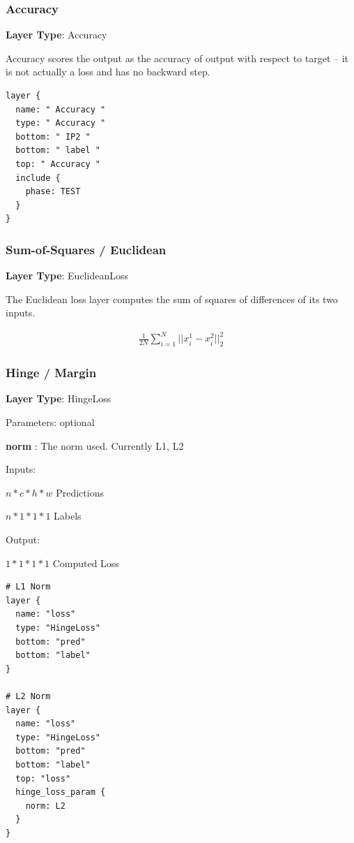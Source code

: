 \documentclass[12pt]{article}
\begin{document}
\subsubsection{Accuracy}

\noindent \textbf{Layer Type}: Accuracy

Accuracy scores the output as the accuracy of output with respect to target – it is not actually a loss and has no backward step.

\begin{lstlisting}[style=json, frame=single]
layer {
  name: " Accuracy "
  type: " Accuracy "
  bottom: " IP2 "
  bottom: " label "
  top: " Accuracy "
  include {
    phase: TEST
  }
}
\end{lstlisting}

\subsubsection{Sum-of-Squares / Euclidean}

\noindent \textbf{Layer Type}: EuclideanLoss

The Euclidean loss layer computes the sum of squares of differences of its two inputs.

\begin{gather}
\frac{1}{2N}\sum_{i=1}^{N}||x_{i}^{1}-x_{i}^{2}||_{2}^{2}
\end{gather}

\subsubsection{Hinge / Margin}

\noindent \textbf{Layer Type}: HingeLoss

\noindent Parameters: optional

\noindent \textbf{norm }: The norm used. Currently L1, L2

\noindent Inputs:

$n * c * h * w$ Predictions

$n * 1 * 1 * 1$ Labels

\noindent Output:

$1 * 1 * 1 * 1$ Computed Loss

\begin{lstlisting}[style=json, frame=single]
# L1 Norm
layer {
  name: "loss"
  type: "HingeLoss"
  bottom: "pred"
  bottom: "label"
}

# L2 Norm
layer {
  name: "loss"
  type: "HingeLoss"
  bottom: "pred"
  bottom: "label"
  top: "loss"
  hinge_loss_param {
    norm: L2
  }
}
\end{lstlisting}
\end{document}
